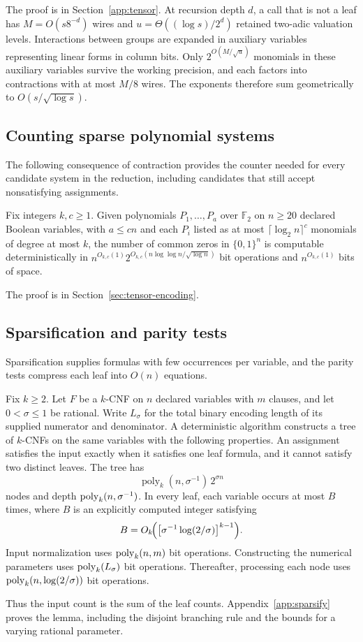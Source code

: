 The proof is in Section~\ref{app:tensor}. At recursion depth $d$,
a call that is not a leaf has $M=O(s8^{-d})$ wires and
$u=\Theta((\log s)/2^d)$ retained two-adic valuation levels.
Interactions between groups are expanded in auxiliary variables representing linear forms in column bits.
Only $2^{O(M/\sqrt u)}$ monomials in these auxiliary variables survive the working precision,
and each factors into contractions with at most $M/8$ wires.
The exponents therefore sum geometrically to $O(s/\sqrt{\log s})$.


\subsection{Counting sparse polynomial systems}
The following consequence of contraction provides the counter needed
for every candidate system in the reduction, including candidates
that still accept nonsatisfying assignments.

\begin{lemma}
\label{lem:tensor-sparse-query}
Fix integers $k,c\ge1$. Given polynomials $P_1,\ldots,P_a$ over
$\mathbb F_2$ on $n\ge20$ declared Boolean variables, with
$a\le cn$ and each $P_i$ listed as at most
$\lceil\log_2 n\rceil^c$ monomials of degree at most $k$, the number
of common zeros in $\{0,1\}^n$ is computable deterministically in
$n^{O_{k,c}(1)}2^{O_{k,c}(n\log\log n/\sqrt{\log n})}$ bit operations and
$n^{O_{k,c}(1)}$ bits of space.
\end{lemma}
The proof is in Section~\ref{sec:tensor-encoding}.

\subsection{Sparsification and parity tests}\label{subsec:main-reductions}
Sparsification supplies formulas with few occurrences per variable,
and the parity tests compress each leaf into $O(n)$ equations.

\begin{lemma}\label{lem:sparsify}
Fix $k\ge2$. Let $F$ be a $k$-CNF on $n$ declared variables with
$m$ clauses, and let $0<\sigma\le1$ be rational. Write $L_\sigma$
for the total binary encoding length of its supplied numerator and
denominator. A deterministic algorithm constructs a tree of $k$-CNFs
on the same variables with the following properties.
An assignment satisfies the input exactly when it satisfies one
leaf formula, and it cannot satisfy two distinct leaves.
The tree has
\[
 \operatorname{poly}_k(n,\sigma^{-1})\,2^{\sigma n}
\]
nodes and depth $\operatorname{poly}_k(n,\sigma^{-1})$.
In every leaf, each variable occurs at most $B$ times, where $B$
is an explicitly computed integer satisfying
\[
 B=O_k\!\Bigl(\bigl[\sigma^{-1}\log(2/\sigma)\bigr]^{k-1}\Bigr).
\]
Input normalization uses $\operatorname{poly}_k(n,m)$ bit operations.
Constructing the numerical parameters uses $\operatorname{poly}_k(L_\sigma)$
bit operations. Thereafter, processing each node uses
$\operatorname{poly}_k(n,\log(2/\sigma))$ bit operations.
\end{lemma}
Thus the input count is the sum of the leaf counts.
Appendix~\ref{app:sparsify} proves the lemma, including the disjoint
branching rule and the bounds for a varying rational parameter.

